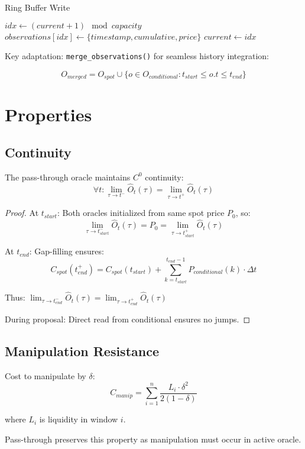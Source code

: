 \documentclass{article}
\begin{document}
\begin{algorithm}
\caption{Ring Buffer Write}
\begin{algorithmic}
\STATE $idx \gets (current + 1) \mod capacity$
\STATE $observations[idx] \gets \{timestamp, cumulative, price\}$
\STATE $current \gets idx$
\end{algorithmic}
\end{algorithm}

Key adaptation: \texttt{merge\_observations()} for seamless history integration:

$$O_{merged} = O_{spot} \cup \{o \in O_{conditional} : t_{start} \leq o.t \leq t_{end}\}$$

\section{Properties}

\subsection{Continuity}
\begin{theorem}
The pass-through oracle maintains $C^0$ continuity:
$$\forall t: \lim_{\tau \to t^-} \hat{O}_t(\tau) = \lim_{\tau \to t^+} \hat{O}_t(\tau)$$
\end{theorem}

\begin{proof}
At $t_{start}$: Both oracles initialized from same spot price $P_0$, so:
$$\lim_{\tau \to t_{start}^-} \hat{O}_t(\tau) = P_0 = \lim_{\tau \to t_{start}^+} \hat{O}_t(\tau)$$

At $t_{end}$: Gap-filling ensures:
$$C_{spot}(t_{end}^+) = C_{spot}(t_{start}) + \sum_{k=t_{start}}^{t_{end}-1} P_{conditional}(k) \cdot \Delta t$$

Thus: $\lim_{\tau \to t_{end}^-} \hat{O}_t(\tau) = \lim_{\tau \to t_{end}^+} \hat{O}_t(\tau)$

During proposal: Direct read from conditional ensures no jumps.
\end{proof}

\subsection{Manipulation Resistance}
Cost to manipulate by $\delta$:
$$C_{manip} = \sum_{i=1}^{n} \frac{L_i \cdot \delta^2}{2(1-\delta)}$$

where $L_i$ is liquidity in window $i$.

Pass-through preserves this property as manipulation must occur in active oracle.
\end{document}
